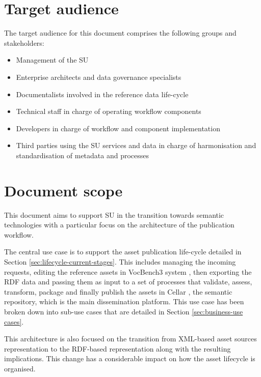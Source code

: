 	
	\section{Target audience}
	\label{sec:audience}
	The target audience for this document comprises the following groups and stakeholders:	
	\begin{itemize}
		\item Management of the SU
		\item Enterprise architects and data governance specialists
		\item Documentalists involved in the reference data life-cycle
		\item Technical staff in charge of operating workflow components
		\item Developers in charge of workflow and component implementation
		\item Third parties using the SU services and data in charge of harmonisation and standardisation of metadata and processes
	\end{itemize}	
	
	\section{Document scope}
	\label{sec:scope}
	
	This document aims to support SU in the transition towards semantic technologies with a particular focus on the architecture of the publication workflow. 
	
	The central use case is to support the asset publication life-cycle detailed in Section \ref{sec:lifecycle-current-stages}. This includes managing the incoming requests, editing the reference assets in VocBench3 system \citep{stellato2017towards,stellatovocbench}, then exporting the RDF data and passing them as input to a set of processes that validate, assess, transform, package and finally publish the assets in Cellar \cite{cdm-francesconi2015ontology}, the semantic repository, which is the main dissemination platform. This use case has been broken down into sub-use cases that are detailed in Section \ref{sec:business-use cases}.
	
	This architecture is also focused on the transition from XML-based asset sources representation to the RDF-based representation along with the resulting implications. This change has a considerable impact on how the asset lifecycle is organised. 
	
